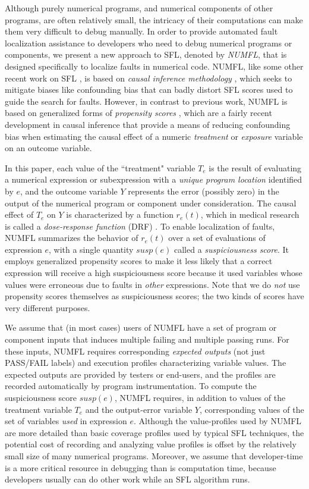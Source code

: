 Although purely numerical programs, and numerical components of other programs, are often relatively small, the intricacy of their computations can make them very difficult to debug manually.  In order to provide automated fault localization assistance to developers who need to debug numerical programs or components, we present a new approach to SFL, denoted by {\it NUMFL}, that is designed specifically to localize faults in numerical code.  NUMFL, like some other recent work on SFL \cite{Baah2010,Baah2011, Gore2012,Shu2013}, is based on {\it causal inference methodology} \cite{Pearl2003}, which seeks to mitigate biases like confounding bias that can badly distort SFL scores used to guide the search for faults.  However, in contrast to previous work, NUMFL is based on generalized forms of {\it propensity scores} \cite{Imai2004,Imai2014}, which are a fairly recent development in causal inference that provide a means of reducing confounding bias when estimating the causal effect of a numeric {\it treatment} or {\it exposure} variable on an outcome variable.

In this paper, each value of the ``treatment" variable $T_e$ is the result of evaluating a numerical expression or subexpression with a {\it unique program location} identified by $e$,   and the outcome variable $Y$ represents the error (possibly zero) in the output of the numerical program or component under consideration.  The causal effect of $T_e$ on $Y$ is characterized by a function $r_e (t)$, which in medical research is called a {\it dose-response function} (DRF) \cite{Hirano2004}.  To enable localization of faults, NUMFL summarizes the behavior of $r_e (t)$ over a set of evaluations of expression $e$, with a single quantity $susp(e)$ called a {\it suspiciousness score}. It employs generalized propensity scores to make it less likely that a correct expression will receive a high suspiciousness score because it used variables whose values were erroneous due to faults in {\it other} expressions. Note that we do {\it not} use propensity scores themselves as suspiciousness scores; the two kinds of scores have very different purposes.

We assume that (in most cases) users of NUMFL have a set of program or component inputs that induces multiple failing and multiple passing runs.  For these inputs, NUMFL requires corresponding {\it expected outputs} (not just PASS/FAIL labels) and execution profiles characterizing variable values.  The expected outputs are provided by testers or end-users, and the profiles are recorded automatically by program instrumentation.  To compute the suspiciousness score $susp(e)$,  NUMFL requires, in addition to values of the treatment variable $T_e$ and the output-error variable $Y$, corresponding values of the set of variables {\it used} in expression $e$.  Although the value-profiles used by NUMFL are more detailed than basic coverage profiles used by typical SFL techniques, the potential cost of recording and analyzing value profiles is offset by the relatively small size of many numerical programs.   Moreover, we assume that developer-time is a more critical resource in debugging than is computation time, because developers usually can do other work while an SFL algorithm runs.

